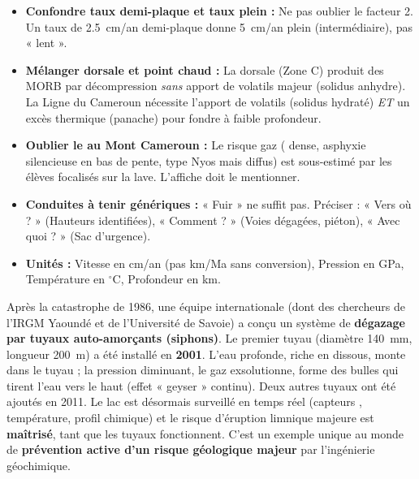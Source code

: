\documentclass[11pt]{article}
\begin{document}
\begin{attention}
\begin{itemize}
    \item \textbf{Confondre taux demi-plaque et taux plein :} Ne pas oublier le facteur 2. Un taux de \SI{2,5}{cm/an} demi-plaque donne \SI{5}{cm/an} plein (intermédiaire), pas « lent ».
    \item \textbf{Mélanger dorsale et point chaud :} La dorsale (Zone C) produit des MORB par décompression \emph{sans} apport de volatils majeur (solidus anhydre). La Ligne du Cameroun nécessite l'apport de volatils (solidus hydraté) \emph{ET} un excès thermique (panache) pour fondre à faible profondeur.
    \item \textbf{Oublier le  au Mont Cameroun :} Le risque gaz ( dense, asphyxie silencieuse en bas de pente, type Nyos mais diffus) est sous-estimé par les élèves focalisés sur la lave. L'affiche doit le mentionner.
    \item \textbf{Conduites à tenir génériques :} « Fuir » ne suffit pas. Préciser : « Vers où ? » (Hauteurs identifiées), « Comment ? » (Voies dégagées, piéton), « Avec quoi ? » (Sac d'urgence).
    \item \textbf{Unités :} Vitesse en cm/an (pas km/Ma sans conversion), Pression en GPa, Température en $^\circ\mathrm{C}$, Profondeur en km.
\end{itemize}
\end{attention}

\begin{savaistu}
\par
Après la catastrophe de 1986, une équipe internationale (dont des chercheurs de l'IRGM Yaoundé et de l'Université de Savoie) a conçu un système de \textbf{dégazage par tuyaux auto-amorçants (siphons)}. Le premier tuyau (diamètre \SI{140}{mm}, longueur \SI{200}{m}) a été installé en \textbf{2001}. L'eau profonde, riche en  dissous, monte dans le tuyau ; la pression diminuant, le gaz exsolutionne, forme des bulles qui tirent l'eau vers le haut (effet « geyser » continu). Deux autres tuyaux ont été ajoutés en 2011. Le lac est désormais surveillé en temps réel (capteurs , température, profil chimique) et le risque d'éruption limnique majeure est \textbf{maîtrisé}, tant que les tuyaux fonctionnent. C'est un exemple unique au monde de \textbf{prévention active d'un risque géologique majeur} par l'ingénierie géochimique.
\end{savaistu}
\end{document}
